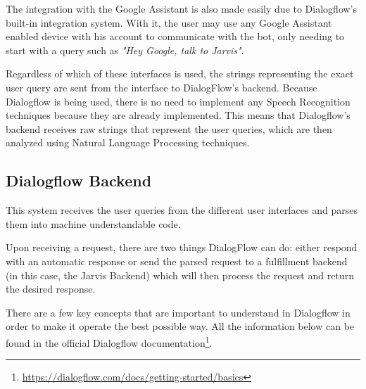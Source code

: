 \documentclass[runningheads]{llncs}
\begin{document}
The integration with the Google Assistant is also made easily due to Dialogflow's built-in integration system. With it, the user may use any Google Assistant enabled device with his account to communicate with the bot, only needing to start with a query such as \textit{"Hey Google, talk to Jarvis"}.

Regardless of which of these interfaces is used, the strings representing the exact user query are sent from the interface to DialogFlow’s backend. Because Dialogflow is being used, there is no need to implement any Speech Recognition techniques because they are already implemented. This means that Dialogflow's backend receives raw strings that represent the user queries, which are then analyzed using Natural Language Processing techniques.

\subsection{Dialogflow Backend}

This system receives the user queries from the different user interfaces and parses them into machine understandable code.

Upon receiving a request, there are two things DialogFlow can do: either respond with an automatic response or send the parsed request to a fulfillment backend (in this case, the Jarvis Backend) which will then process the request and return the desired response.

There are a few key concepts that are important to understand in Dialogflow in order to make it operate the best possible way. All the information below can be found in the official Dialogflow documentation\footnote{\url{https://dialogflow.com/docs/getting-started/basics}}.
\end{document}
